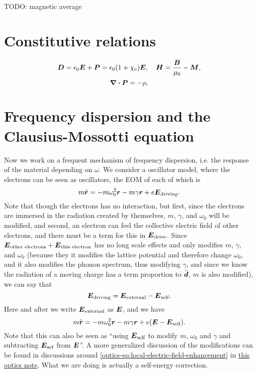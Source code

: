 \documentclass[hyperref, a4paper]{article}
\newcommand{\opticsdoc}{\href{../optics/optics.pdf}{this optics note}}
\begin{document}
TODO: magnetic average

\section{Constitutive relations}

\begin{equation}
    \vb*{D} = \epsilon_0 \vb*{E} + \vb*{P} = \epsilon_0 (1 + \chi_\text{e}) \vb*{E}, \quad 
    \vb*{H} = \frac{\vb*{B}}{\mu_0} - \vb*{M},
\end{equation}
\begin{equation}
    \div{\vb*{P}} = - \rho,
\end{equation}


\section{Frequency dispersion and the Clausius-Mossotti equation}\label{sec:clausius}

Now we work on a frequent mechanism of frequency dispersion, i.e. the response of the material depending on 
$\omega$. We consider a oscillator model, where the electrons can be seen as oscillators, 
the EOM of each of which is
\begin{equation}
    m \ddot{\vb*{r}} = - m \omega_0^2 \vb*{r} - m \gamma \vb*{r} + e \vb*{E}_\text{driving}.
\end{equation}
Note that though the electrons has no interaction, but first, since the electrons are immersed in the 
radiation created by themselves, $m$, $\gamma$, and $\omega_0$ will be modified, and second, an electron 
can feel the collective electric field of other electrons, and there must be a term for this in 
$\vb*{E}_\text{drive}$. Since $\vb*{E}_\text{other electrons} + \vb*{E}_\text{this electron}$ has no
long scale effects and only modifies $m$, $\gamma$, and $\omega_0$ (because they it modifies the lattice potential
and therefore change $\omega_0$, and it also modifies the phonon spectrum, thus modifying $\gamma$, and 
since we know the radiation of a moving charge has a term proportion to $\ddot{\vb*{d}}$, $m$ is also modified),
we can say that 
\[
    \vb*{E}_\text{driving} = \vb*{E}_\text{external} - \vb*{E}_\text{self}.
\]
Here and after we write $\vb*{E}_\text{external}$ as $\vb*{E}$, and we have 
\begin{equation}
    m \ddot{\vb*{r}} = - m \omega_0^2 \vb*{r} - m \gamma \vb*{r} + e (\vb*{E} - \vb*{E}_\text{self}).
\end{equation}
Note that this can also be seen as ``using $\vb*{E}_\text{self}$ to modify $m$, $\omega_0$ and $\gamma$ and
subtracting $\vb*{E}_\text{sef}$ from $\vb*{E}$''. A more generalized discussion of the modifications 
can be found in discussions around \eqref{optics-eq:local-electric-field-enhancement} in \opticsdoc.
What we are doing is actually a self-energy correction.
\end{document}
